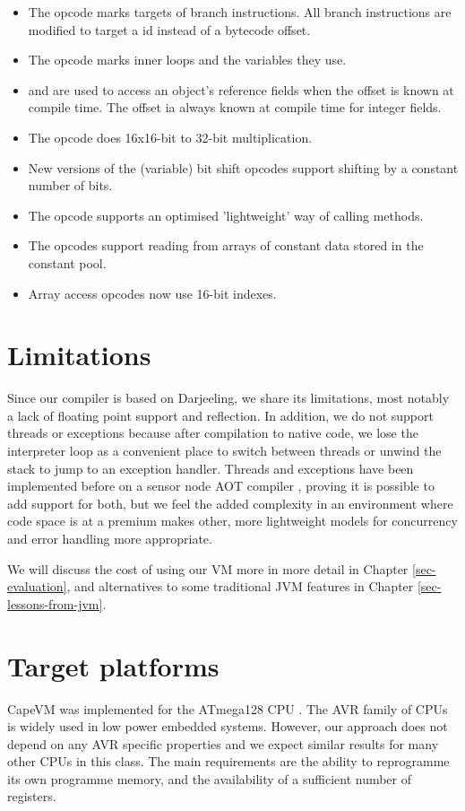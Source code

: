 \begin{itemize}
	\item The  opcode marks targets of branch instructions. All branch instructions are modified to target a  id instead of a bytecode offset.
	\item The  opcode marks inner loops and the variables they use.
	\item {} and  are used to access an object's reference fields when the offset is known at compile time. The offset ia always known at compile time for integer fields.
	\item The  opcode does 16x16-bit to 32-bit multiplication.
	\item New  versions of the (variable) bit shift opcodes support shifting by a constant number of bits.
	\item The  opcode supports an optimised 'lightweight' way of calling methods.
	\item The  opcodes support reading from arrays of constant data stored in the constant pool.
	\item Array access opcodes now use 16-bit indexes.
\end{itemize}


\section{Limitations}
Since our compiler is based on Darjeeling, we share its limitations, most notably a lack of floating point support and reflection. In addition, we do not support threads or exceptions because after compilation to native code, we lose the interpreter loop as a convenient place to switch between threads or unwind the stack to jump to an exception handler. Threads and exceptions have been implemented before on a sensor node AOT compiler \cite{Ellul:2012thesis}, proving it is possible to add support for both, but we feel the added complexity in an environment where code space is at a premium makes other, more lightweight models for concurrency and error handling more appropriate.

We will discuss the cost of using our VM more in more detail in Chapter \ref{sec-evaluation}, and alternatives to some traditional JVM features in Chapter \ref{sec-lessons-from-jvm}.


\section{Target platforms}
CapeVM was implemented for the ATmega128 CPU \cite{Atmel:ATmega128Datasheet}. The AVR family of CPUs is widely used in low power embedded systems. However, our approach does not depend on any AVR specific properties and we expect similar results for many other CPUs in this class. The main requirements are the ability to reprogramme its own programme memory, and the availability of a sufficient number of registers.


